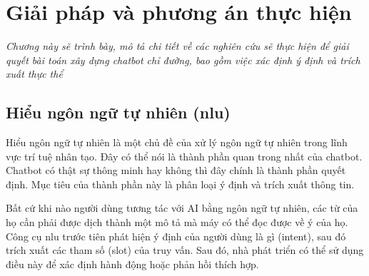 \chapter{Giải pháp và phương án thực hiện}
\label{Chapter3}

\emph{Chương này sẽ trình bày, mô tả chi tiết về các nghiên cứu sẽ thực hiện để giải quyết bài toán xây dựng chatbot chỉ đường, bao gồm việc xác định ý định và trích xuất thực thể}

\section{Hiểu ngôn ngữ tự nhiên (\ac{nlu})}

Hiểu ngôn ngữ tự nhiên là một chủ đề của xử lý ngôn ngữ tự nhiên trong lĩnh vực trí tuệ nhân tạo. Đây có thể nói là thành phần quan trong nhất của chatbot. Chatbot có thật sự thông minh hay không thì đây chính là thành phần quyết định. Mục tiêu của thành phần này là phân loại ý định và trích xuất thông tin.

Bất cứ khi nào người dùng tương tác với AI bằng ngôn ngữ tự nhiên, các từ của họ cần phải được dịch thành một mô tả mà máy có thể đọc được về ý của họ.
Công cụ \ac{nlu} trước tiên phát hiện ý định của người dùng là gì (intent), sau đó trích xuất các tham số (slot) của truy vấn. Sau đó, nhà phát triển có thể sử dụng điều này để xác định hành động hoặc phản hồi thích hợp.

